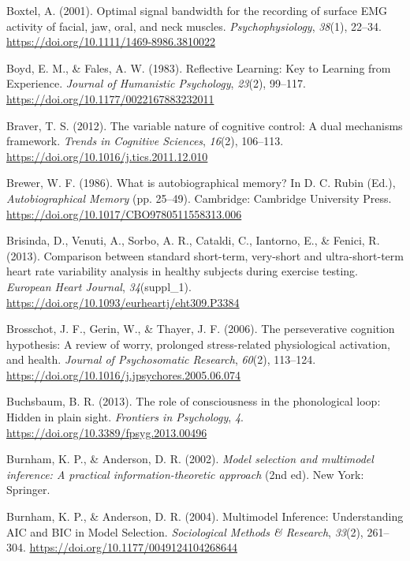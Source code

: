 \documentclass[a4paper,12pt,twoside,onecolumn,openright,final,oldfontcommands]{memoir}
\begin{document}
\leavevmode\hypertarget{ref-boxtel_optimal_2001}{}%
Boxtel, A. (2001). Optimal signal bandwidth for the recording of surface EMG activity of facial, jaw, oral, and neck muscles. \emph{Psychophysiology}, \emph{38}(1), 22--34. \url{https://doi.org/10.1111/1469-8986.3810022}

\leavevmode\hypertarget{ref-boyd_reflective_1983}{}%
Boyd, E. M., \& Fales, A. W. (1983). Reflective Learning: Key to Learning from Experience. \emph{Journal of Humanistic Psychology}, \emph{23}(2), 99--117. \url{https://doi.org/10.1177/0022167883232011}

\leavevmode\hypertarget{ref-braver_variable_2012}{}%
Braver, T. S. (2012). The variable nature of cognitive control: A dual mechanisms framework. \emph{Trends in Cognitive Sciences}, \emph{16}(2), 106--113. \url{https://doi.org/10.1016/j.tics.2011.12.010}

\leavevmode\hypertarget{ref-rubin_what_1986}{}%
Brewer, W. F. (1986). What is autobiographical memory? In D. C. Rubin (Ed.), \emph{Autobiographical Memory} (pp. 25--49). Cambridge: Cambridge University Press. \url{https://doi.org/10.1017/CBO9780511558313.006}

\leavevmode\hypertarget{ref-brisinda_comparison_2013}{}%
Brisinda, D., Venuti, A., Sorbo, A. R., Cataldi, C., Iantorno, E., \& Fenici, R. (2013). Comparison between standard short-term, very-short and ultra-short-term heart rate variability analysis in healthy subjects during exercise testing. \emph{European Heart Journal}, \emph{34}(suppl\_1). \url{https://doi.org/10.1093/eurheartj/eht309.P3384}

\leavevmode\hypertarget{ref-Brosschot2006}{}%
Brosschot, J. F., Gerin, W., \& Thayer, J. F. (2006). The perseverative cognition hypothesis: A review of worry, prolonged stress-related physiological activation, and health. \emph{Journal of Psychosomatic Research}, \emph{60}(2), 113--124. \url{https://doi.org/10.1016/j.jpsychores.2005.06.074}

\leavevmode\hypertarget{ref-buchsbaum_role_2013}{}%
Buchsbaum, B. R. (2013). The role of consciousness in the phonological loop: Hidden in plain sight. \emph{Frontiers in Psychology}, \emph{4}. \url{https://doi.org/10.3389/fpsyg.2013.00496}

\leavevmode\hypertarget{ref-burnham_model_2002}{}%
Burnham, K. P., \& Anderson, D. R. (2002). \emph{Model selection and multimodel inference: A practical information-theoretic approach} (2nd ed). New York: Springer.

\leavevmode\hypertarget{ref-burnham_multimodel_2004}{}%
Burnham, K. P., \& Anderson, D. R. (2004). Multimodel Inference: Understanding AIC and BIC in Model Selection. \emph{Sociological Methods \& Research}, \emph{33}(2), 261--304. \url{https://doi.org/10.1177/0049124104268644}
\end{document}

